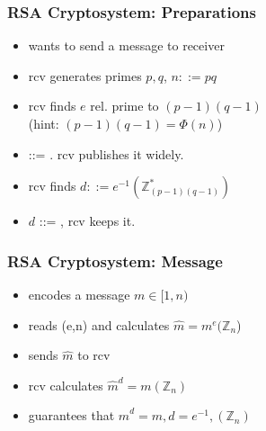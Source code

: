 \documentclass{beamer}
\begin{document}
\begin{frame}
  \frametitle{RSA Cryptosystem: Preparations}

  {\larger
    \begin{itemize}
    \item {} wants to send a message to \alert{receiver}
    \item \alert{rcv} generates primes $p,q$, $n::=pq$
    \item<2-> \alert{rcv} finds $e$ rel. prime to $(p-1)(q-1)$\\\hfill (hint: $(p-1)(q-1) = \Phi(n)$)
    \item<3->  ::= .
      \alert{rcv} publishes it widely.
    \item<4-> \alert{rcv} finds $d::=e^{-1} (\mathbb{Z}^*_{(p-1)(q-1)})$
    \item<4-> $d$ ::= , \alert{rcv} keeps it.
    \end{itemize}
  }
\end{frame}

\begin{frame}
  \frametitle{RSA Cryptosystem: Message}

  {\larger
    \begin{itemize}
    \item {} encodes a message $m \in [1,n)$
    \item <2-> reads (e,n) and calculates
      $\hat{m} = m^e (\mathbb{Z}_n$)
    \item <2-> sends $\hat{m}$ to \alert{rcv}
    \item <3->\alert{rcv} calculates $\hat{m}^d = m (\mathbb{Z}_n)$

      \bigskip

    \item <4-> guarantees that $\hat{m}^d = m, d = e^{-1}, (\mathbb{Z}_n)$
    \end{itemize}
  }
\end{frame}
\end{document}
